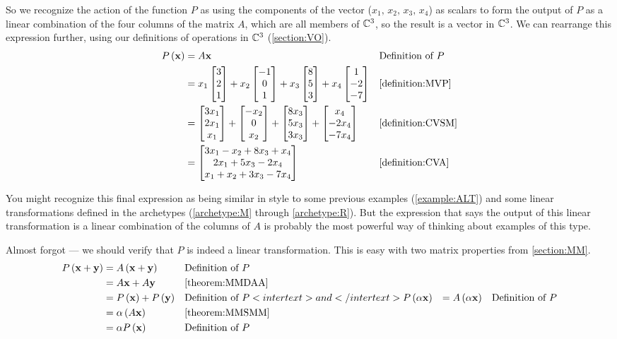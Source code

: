 \documentclass{ximera}
\begin{document}
\begin{example}
So we recognize the action of the function $P$ as using the components of the vector ($x_1,\,x_2,\,x_3,\,x_4$) as scalars to form the output of $P$ as a linear combination of the four columns of the matrix $A$, which are all members of $\mathbb{C}^{3}$, so the result is a vector in $\mathbb{C}^{3}$.  We can rearrange this expression further, using our definitions of operations in $\mathbb{C}^{3}$ (\ref{section:VO}).
\begin{align*}
P\left(\mathbf{x}\right)
&=A\mathbf{x}&&\text{Definition of $P$}\\
&=
x_1\begin{bmatrix}3\\2\\1\end{bmatrix}+
x_2\begin{bmatrix}-1\\0\\1\end{bmatrix}+
x_3\begin{bmatrix}8\\5\\3\end{bmatrix}+
x_4\begin{bmatrix}1\\-2\\-7\end{bmatrix}&&\ref{definition:MVP}\\
&=
\begin{bmatrix}3x_1\\2x_1\\x_1\end{bmatrix}+
\begin{bmatrix}-x_2\\0\\x_2\end{bmatrix}+
\begin{bmatrix}8x_3\\5x_3\\3x_3\end{bmatrix}+
\begin{bmatrix}x_4\\-2x_4\\-7x_4\end{bmatrix}&&\ref{definition:CVSM}\\
&=\begin{bmatrix}3x_1-x_2+8x_3+x_4\\2x_1+5x_3-2x_4\\x_1+x_2+3x_3-7x_4\end{bmatrix}&&\ref{definition:CVA}
\end{align*}




You might recognize this final expression as being similar in style to some previous examples (\ref{example:ALT}) and some linear transformations defined in the archetypes (\ref{archetype:M} through \ref{archetype:R}).  But the expression that says the output of this linear transformation is a linear combination of the columns of $A$ is probably the most powerful way of thinking about examples of this type.



Almost forgot --- we should verify that $P$ is indeed a linear transformation.  This is easy with two matrix properties from \ref{section:MM}.
\begin{align*}
P\left(\mathbf{x}+\mathbf{y}\right)
&=A\left(\mathbf{x}+\mathbf{y}\right)&&\text{Definition of $P$}\\
&=A\mathbf{x}+A\mathbf{y}&&\ref{theorem:MMDAA}\\
&=P\left(\mathbf{x}\right)+P\left(\mathbf{y}\right)&&\text{Definition of $P$}
<intertext>and</intertext>
P\left(\alpha\mathbf{x}\right)
&=A\left(\alpha\mathbf{x}\right)&&\text{Definition of $P$}\\
&=\alpha\left(A\mathbf{x}\right)&&\ref{theorem:MMSMM}\\
&=\alpha P\left(\mathbf{x}\right)&&\text{Definition of $P$}
\end{align*}





\end{example}
\end{document}
